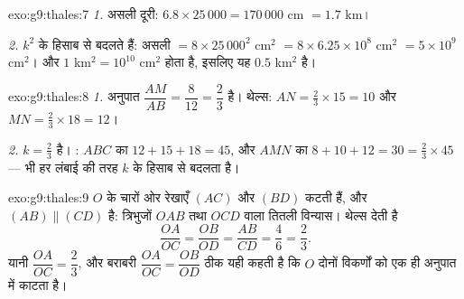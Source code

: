 \begin{solution}{exo:g9:thales:7}
\emph{1.} असली दूरी: $6.8 \times 25\,000 = 170\,000$ cm $=
1.7$ km।

\emph{2.}  $k^2$ के हिसाब से बदलते हैं: असली 
$= 8 \times 25\,000^2$ cm$^2$ $= 8 \times 6.25 \times 10^8$ cm$^2$
$= 5 \times 10^9$ cm$^2$। और $1$ km$^2 = 10^{10}$ cm$^2$ होता है,
इसलिए यह $0.5$ km$^2$ है।
\end{solution}

\begin{solution}{exo:g9:thales:8}
\emph{1.} अनुपात $\dfrac{AM}{AB} = \dfrac{8}{12} = \dfrac23$ है।
थेल्स: $AN = \frac23 \times 15 = 10$ और $MN = \frac23 \times 18 = 12$।

\emph{2.}  $k = \frac23$ है। : $ABC$ का
$12 + 15 + 18 = 45$, और $AMN$ का
$8 + 10 + 12 = 30 = \frac23 \times 45$ ---  भी हर लंबाई की तरह
$k$ के हिसाब से बदलता है।
\end{solution}

\begin{solution}{exo:g9:thales:9}
$O$ के चारों ओर रेखाएँ $(AC)$ और $(BD)$ कटती हैं, और
$(AB) \parallel (CD)$ है: त्रिभुजों $OAB$ तथा $OCD$ वाला तितली
विन्यास। थेल्स देती है
\[
\frac{OA}{OC} = \frac{OB}{OD} = \frac{AB}{CD} = \frac46 = \frac23 .
\]
यानी $\dfrac{OA}{OC} = \dfrac23$, और बराबरी
$\dfrac{OA}{OC} = \dfrac{OB}{OD}$ ठीक यही कहती है कि $O$ दोनों
विकर्णों को एक ही अनुपात में काटता है।
\end{solution}

